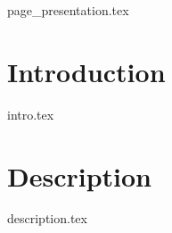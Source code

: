 \documentclass[12pt,ULlof,ULlot]{ULrapport}
\begin{document}
	
{page_presentation.tex}
\chapter{Introduction}

{intro.tex}
\chapter{Description}
{description.tex}

%
%
\end{document}
